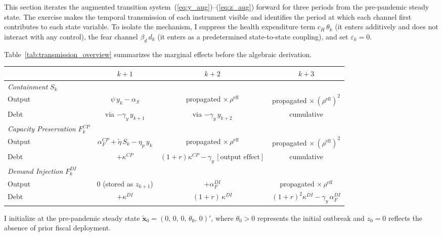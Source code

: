 \documentclass[12pt, a4paper]{article}
\begin{document}
This section iterates the augmented transition
system~(\ref{eq:y_aug})--(\ref{eq:z_aug}) forward for three periods from the
pre-pandemic steady state. The exercise makes the temporal transmission of each
instrument visible and identifies the period at which each channel first
contributes to each state variable. To isolate the mechanism, I suppress the
health expenditure term $c_H\,\theta_k$ (it enters additively and does not
interact with any control), the fear channel $\beta_d\, d_k$ (it enters as a
predetermined state-to-state coupling), and set $\varepsilon_k = 0$.

Table~\ref{tab:transmission_overview} summarizes the marginal effects before
the algebraic derivation.

\begin{center}
\small
\begin{tabular}{lccc}
\toprule
 & $k+1$ & $k+2$ & $k+3$ \\
\midrule
\textit{Containment} $S_k$ \\
\quad Output
  & $\psi\, y_k - \alpha_S$
  & propagated $\times\, \rho^{\mathrm{eff}}$
  & propagated $\times\, (\rho^{\mathrm{eff}})^2$ \\
\quad Debt
  & via $-\gamma_y\, y_{k+1}$
  & via $-\gamma_y\, y_{k+2}$
  & cumulative \\[4pt]
\textit{Capacity Preservation} $F^{CP}_k$ \\
\quad Output
  & $\alpha_F^{CP} + \tilde{\eta}\, S_k - \eta_p\, y_k$
  & propagated $\times\, \rho^{\mathrm{eff}}$
  & propagated $\times\, (\rho^{\mathrm{eff}})^2$ \\
\quad Debt
  & $+\kappa^{CP}$
  & $(1{+}r)\kappa^{CP} - \gamma_y\,[\text{output effect}]$
  & cumulative \\[4pt]
\textit{Demand Injection} $F^{DI}_k$ \\
\quad Output
  & $0$ (stored as $z_{k+1}$)
  & $+\alpha_F^{DI}$
  & propagated $\times\, \rho^{\mathrm{eff}}$ \\
\quad Debt
  & $+\kappa^{DI}$
  & $(1{+}r)\,\kappa^{DI}$
  & $(1{+}r)^2\kappa^{DI} - \gamma_y\,\alpha_F^{DI}$ \\
\bottomrule
\end{tabular}
\label{tab:transmission_overview}
\end{center}

\medskip

\noindent I initialize at the pre-pandemic steady state
$\tilde{\bm{x}}_0 = (0,\, 0,\, 0,\, \theta_0,\, 0)'$, where $\theta_0 > 0$
represents the initial outbreak and $z_0 = 0$ reflects the absence of prior
fiscal deployment.
\end{document}
